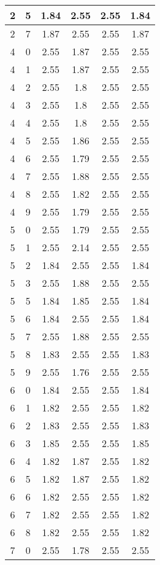 \begin{longtable}{|c|c||c||c|c||c|}
	2 & 5 & 1.84 & 2.55 & 2.55 & 1.84 \\ \hline
	2 & 7 & 1.87 & 2.55 & 2.55 & 1.87 \\ \hline
	4 & 0 & 2.55 & 1.87 & 2.55 & 2.55 \\ \hline
	4 & 1 & 2.55 & 1.87 & 2.55 & 2.55 \\ \hline
	4 & 2 & 2.55 & 1.8 & 2.55 & 2.55 \\ \hline
	4 & 3 & 2.55 & 1.8 & 2.55 & 2.55 \\ \hline
	4 & 4 & 2.55 & 1.8 & 2.55 & 2.55 \\ \hline
	4 & 5 & 2.55 & 1.86 & 2.55 & 2.55 \\ \hline
	4 & 6 & 2.55 & 1.79 & 2.55 & 2.55 \\ \hline
	4 & 7 & 2.55 & 1.88 & 2.55 & 2.55 \\ \hline
	4 & 8 & 2.55 & 1.82 & 2.55 & 2.55 \\ \hline
	4 & 9 & 2.55 & 1.79 & 2.55 & 2.55 \\ \hline
	5 & 0 & 2.55 & 1.79 & 2.55 & 2.55 \\ \hline
	5 & 1 & 2.55 & 2.14 & 2.55 & 2.55 \\ \hline
	5 & 2 & 1.84 & 2.55 & 2.55 & 1.84 \\ \hline
	5 & 3 & 2.55 & 1.88 & 2.55 & 2.55 \\ \hline
	5 & 5 & 1.84 & 1.85 & 2.55 & 1.84 \\ \hline
	5 & 6 & 1.84 & 2.55 & 2.55 & 1.84 \\ \hline
	5 & 7 & 2.55 & 1.88 & 2.55 & 2.55 \\ \hline
	5 & 8 & 1.83 & 2.55 & 2.55 & 1.83 \\ \hline
	5 & 9 & 2.55 & 1.76 & 2.55 & 2.55 \\ \hline
	6 & 0 & 1.84 & 2.55 & 2.55 & 1.84 \\ \hline
	6 & 1 & 1.82 & 2.55 & 2.55 & 1.82 \\ \hline
	6 & 2 & 1.83 & 2.55 & 2.55 & 1.83 \\ \hline
	6 & 3 & 1.85 & 2.55 & 2.55 & 1.85 \\ \hline
	6 & 4 & 1.82 & 1.87 & 2.55 & 1.82 \\ \hline
	6 & 5 & 1.82 & 1.87 & 2.55 & 1.82 \\ \hline
	6 & 6 & 1.82 & 2.55 & 2.55 & 1.82 \\ \hline
	6 & 7 & 1.82 & 2.55 & 2.55 & 1.82 \\ \hline
	6 & 8 & 1.82 & 2.55 & 2.55 & 1.82 \\ \hline
	7 & 0 & 2.55 & 1.78 & 2.55 & 2.55 \\ \hline

\end{longtable}
